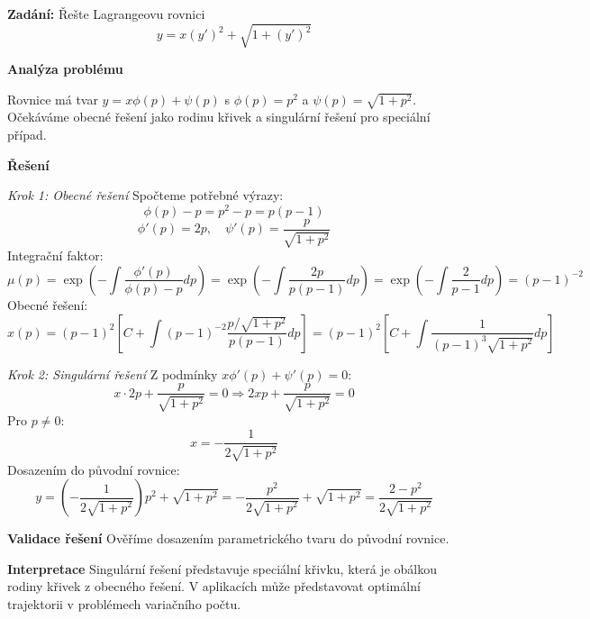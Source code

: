 \begin{example}
    \label{ex:kvadraticka-lagrange}
    
    \noindent\textbf{Zadání:} Řešte Lagrangeovu rovnici
    \[
    y = x(y')^2 + \sqrt{1 + (y')^2}
    \]
    
    \vspace{1.5\baselineskip}
    
    \noindent\textbf{Analýza problému}
    
    Rovnice má tvar $y = x\phi(p) + \psi(p)$ s $\phi(p) = p^2$ a $\psi(p) = \sqrt{1 + p^2}$. Očekáváme obecné řešení jako rodinu křivek a singulární řešení pro speciální případ.
    
    \vspace{1.5\baselineskip}
    
    \noindent\textbf{Řešení}
    
    \noindent\textit{Krok 1: Obecné řešení}
    Spočteme potřebné výrazy:
    \[
    \phi(p) - p = p^2 - p = p(p - 1)
    \]
    \[
    \phi'(p) = 2p, \quad \psi'(p) = \frac{p}{\sqrt{1 + p^2}}
    \]
    Integrační faktor:
    \[
    \mu(p) = \exp\left(-\int \frac{\phi'(p)}{\phi(p)-p} dp\right) = \exp\left(-\int \frac{2p}{p(p-1)} dp\right) = \exp\left(-\int \frac{2}{p-1} dp\right) = (p-1)^{-2}
    \]
    Obecné řešení:
    \[
    x(p) = (p-1)^2 \left[ C + \int (p-1)^{-2} \frac{p/\sqrt{1+p^2}}{p(p-1)} dp \right] = (p-1)^2 \left[ C + \int \frac{1}{(p-1)^3\sqrt{1+p^2}} dp \right]
    \]
    
    \vspace{1\baselineskip}
    
    \noindent\textit{Krok 2: Singulární řešení}
    Z podmínky $x\phi'(p) + \psi'(p) = 0$:
    \[
    x\cdot 2p + \frac{p}{\sqrt{1+p^2}} = 0 \Rightarrow 2xp + \frac{p}{\sqrt{1+p^2}} = 0
    \]
    Pro $p \neq 0$:
    \[
    x = -\frac{1}{2\sqrt{1+p^2}}
    \]
    Dosazením do původní rovnice:
    \[
    y = \left(-\frac{1}{2\sqrt{1+p^2}}\right)p^2 + \sqrt{1+p^2} = -\frac{p^2}{2\sqrt{1+p^2}} + \sqrt{1+p^2} = \frac{2 - p^2}{2\sqrt{1+p^2}}
    \]
    
    \vspace{1.5\baselineskip}
    
    \noindent\textbf{Validace řešení}
    Ověříme dosazením parametrického tvaru do původní rovnice.
    
    \vspace{1.5\baselineskip}
    
    \noindent\textbf{Interpretace}
    Singulární řešení představuje speciální křivku, která je obálkou rodiny křivek z obecného řešení. V aplikacích může představovat optimální trajektorii v problémech variačního počtu.
    
    \end{example}
    
